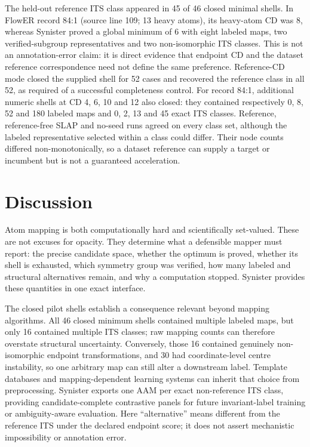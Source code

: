 \documentclass[11pt]{article}
\begin{document}
The held-out reference ITS class appeared in 45 of 46 closed minimal shells.
In FlowER record 84:1 (source line 109; 13 heavy atoms), its heavy-atom CD was
8, whereas Synister proved a global minimum of 6 with eight labeled maps, two
verified-subgroup representatives and two non-isomorphic ITS classes.  This
is not an annotation-error claim: it is direct evidence that endpoint CD and
the dataset reference correspondence need not define the same preference.
Reference-CD mode closed the supplied shell for 52 cases and recovered the
reference class in all 52, as required of a successful completeness control.
For record 84:1, additional numeric shells at CD 4, 6, 10 and 12 also closed:
they contained respectively 0, 8, 52 and 180 labeled maps and 0, 2, 13 and 45
exact ITS classes.  Reference, reference-free SLAP and no-seed runs agreed on
every class set, although the labeled representative selected within a class
could differ.  Their node counts differed non-monotonically, so a dataset reference
can supply a target or incumbent but is not a guaranteed acceleration.

\section*{Discussion}

Atom mapping is both computationally hard and scientifically set-valued.
These are not excuses for opacity.  They determine what a defensible mapper
must report: the precise candidate space, whether the optimum is proved,
whether its shell is exhausted, which symmetry group was verified, how many
labeled and structural alternatives remain, and why a computation stopped.
Synister provides these quantities in one exact interface.

The closed pilot shells establish a consequence relevant beyond mapping
algorithms.  All 46 closed minimum shells contained multiple labeled maps, but
only 16 contained multiple ITS classes; raw mapping counts can therefore
overstate structural uncertainty.  Conversely, those 16 contained genuinely
non-isomorphic endpoint transformations, and 30 had coordinate-level centre
instability, so one arbitrary map can still alter a downstream label.
Template databases and mapping-dependent learning systems can inherit that
choice from preprocessing.  Synister exports one AAM per exact non-reference
ITS class, providing candidate-complete contrastive panels for future
invariant-label training or ambiguity-aware evaluation.  Here ``alternative''
means different from the reference ITS under the declared endpoint score; it
does not assert mechanistic impossibility or annotation error.
\end{document}
